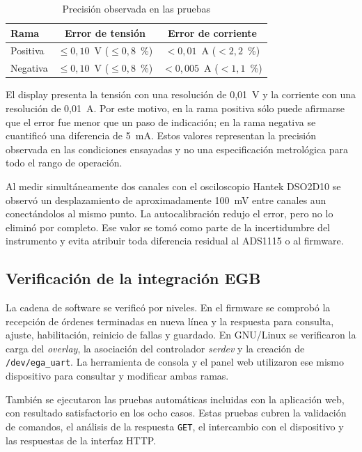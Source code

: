 \documentclass[conference]{IEEEtran}
\begin{document}
\begin{table}[!t]
\caption{Precisión observada en las pruebas}
\label{tab:precision}
\centering
\footnotesize
\begin{tabular}{@{}lcc@{}}
\toprule
\textbf{Rama} & \textbf{Error de tensión} & \textbf{Error de corriente} \\
\midrule
Positiva & $\leq 0,10$~V ($\leq 0,8$~\%) & $<0,01$~A ($<2,2$~\%) \\
Negativa & $\leq 0,10$~V ($\leq 0,8$~\%) & $<0,005$~A ($<1,1$~\%) \\
\bottomrule
\end{tabular}
\end{table}

El display presenta la tensión con una resolución de 0,01~V y la corriente con una resolución de 0,01~A. Por este motivo, en la rama positiva sólo puede afirmarse que el error fue menor que un paso de indicación; en la rama negativa se cuantificó una diferencia de 5~mA. Estos valores representan la precisión observada en las condiciones ensayadas y no una especificación metrológica para todo el rango de operación.

Al medir simultáneamente dos canales con el osciloscopio Hantek DSO2D10 se observó un desplazamiento de aproximadamente 100~mV entre canales aun conectándolos al mismo punto. La autocalibración redujo el error, pero no lo eliminó por completo. Ese valor se tomó como parte de la incertidumbre del instrumento y evita atribuir toda diferencia residual al ADS1115 o al firmware.

\subsection{Verificación de la integración EGB}

La cadena de software se verificó por niveles. En el firmware se comprobó la recepción de órdenes terminadas en nueva línea y la respuesta para consulta, ajuste, habilitación, reinicio de fallas y guardado. En GNU/Linux se verificaron la carga del \textit{overlay}, la asociación del controlador \textit{serdev} y la creación de \texttt{/dev/ega\_uart}. La herramienta de consola y el panel web utilizaron ese mismo dispositivo para consultar y modificar ambas ramas.

También se ejecutaron las pruebas automáticas incluidas con la aplicación web, con resultado satisfactorio en los ocho casos. Estas pruebas cubren la validación de comandos, el análisis de la respuesta \texttt{GET}, el intercambio con el dispositivo y las respuestas de la interfaz HTTP.
\end{document}
